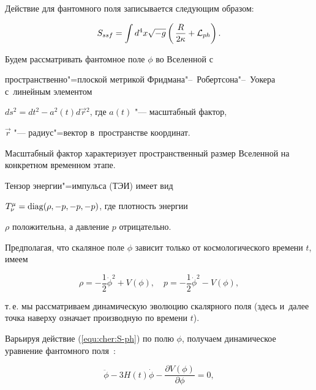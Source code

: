 %

Действие для фантомного поля записывается следующим образом: %

\begin{equation} \label{equ:cher:S-ph} %

S_{ssf} = \int d^4x \sqrt{-g} \left( \,\frac{R}{2\kappa}+

{\cal L}_{ph}  \right).%

\end{equation}

%



Будем рассматривать фантомное поле $ \phi $ во Вселенной с

пространственно"=плоской метрикой Фридмана"--~Робертсона"--~Уокера с~линейным элементом 

$ds^2=dt^2-a^2(t)d\vec{r}{}^2$, где $ a(t) $ "--- масштабный фактор, 

$\vec{r}$ "--- радиус"=вектор в~пространстве координат. 

Масштабный фактор характеризует пространственный размер Вселенной на конкретном временном этапе.

Тензор энергии"=импульса (ТЭИ) имеет вид

$ T^{\mu}_{\nu} = {\rm diag} (\rho,-p,-p,-p) $, где плотность энергии

$ \rho $ положительна, а давление $ p $ отрицательно. 

Предполагая, что скаляное поле $ \phi $ зависит только от космологического времени $ t $, имеем

\begin{equation} \label{equ:cher:pro} %

\rho = -\frac12 \dot{\phi}^2 + V(\phi), \quad p = -\frac12 \dot{\phi}^2 - V(\phi),%

\end{equation}

т.\,е. мы рассматриваем динамическую эволюцию скалярного поля (здесь и~далее точка наверху означает производную по времени $t$).



Варьируя действие (\ref{equ:cher:S-ph}) по полю $ \phi $, получаем динамическое уравнение фантомного поля~\cite{chervon:fks}:

\begin{equation} \label{equ:cher:F}

\ddot {\phi}-3H(t)\dot {\phi} -\frac{\partial V(\phi)}{\partial \phi}=0,

\end{equation}

